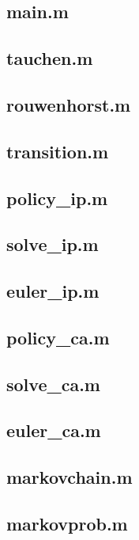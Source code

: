 \documentclass[12pt]{article}
\newcommand{\1}{{\bf 1}} %
\begin{document}
\subsection{main.m}

\subsection{tauchen.m}

\subsection{rouwenhorst.m}

\subsection{transition.m}

\subsection{policy\_ip.m}

\subsection{solve\_ip.m}

\subsection{euler\_ip.m}

\subsection{policy\_ca.m}

\subsection{solve\_ca.m}

\subsection{euler\_ca.m}

\subsection{markovchain.m}

\subsection{markovprob.m}

\end{document}
